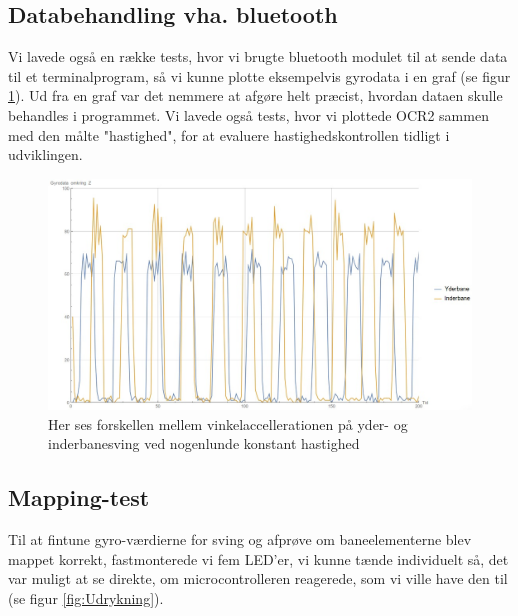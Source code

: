 \pagebreak

\subsection{Databehandling vha. bluetooth}

Vi lavede også en række tests, hvor vi brugte bluetooth modulet til at sende data til et terminalprogram, så vi kunne plotte eksempelvis gyrodata i en graf (se figur \ref{fig:Gyro}). Ud fra en graf var det nemmere at afgøre helt præcist, hvordan dataen skulle behandles i programmet. Vi lavede også tests, hvor vi plottede OCR2 sammen med den målte "hastighed", for at evaluere hastighedskontrollen tidligt i udviklingen.

\begin{figure}[h]

	\centering
		\includegraphics[scale=0.4]{Billeder/Gyro.jpg}
	\caption{Her ses forskellen mellem vinkelaccellerationen på yder- og inderbanesving ved nogenlunde konstant hastighed}
	\label{fig:Gyro}
	
\end{figure}

\pagebreak

\subsection{Mapping-test}

Til at fintune gyro-værdierne for sving og afprøve om baneelementerne blev mappet korrekt, fastmonterede vi fem LED'er, vi kunne tænde individuelt så, det var muligt at se direkte, om microcontrolleren reagerede, som vi ville have den til (se figur \ref{fig:Udrykning}). 

